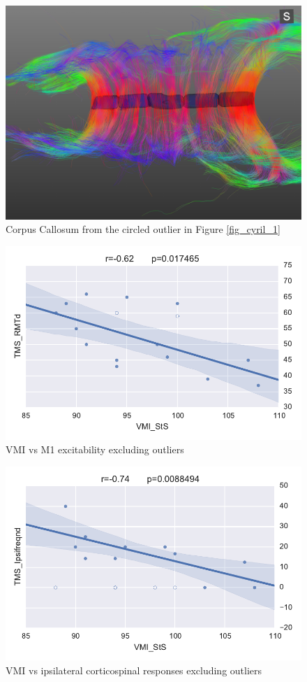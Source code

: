 \documentclass{frontiersHLTH}
\begin{document}
\begin{figure}
	\centering
		\includegraphics[width=\linewidth]{cc_cyril}
	\caption{Corpus Callosum from the circled outlier in Figure \ref{fig_cyril_1}}
	\label{fig_cyril_2}
\end{figure}


\begin{figure}
	\centering
		\includegraphics[width=0.9\linewidth]{cyricl_corr_1}
	\caption{VMI vs M1 excitability excluding outliers}
	\label{fig_cyril_4}
\end{figure}

\begin{figure}
	\centering
		\includegraphics[width=0.9\linewidth]{corr_cyril_2}
	\caption{VMI vs ipsilateral corticospinal responses excluding outliers}
	\label{fig_cyril_5}
\end{figure}
\end{document}
